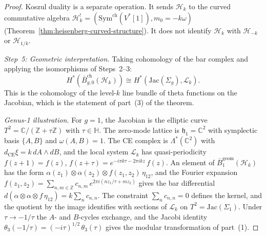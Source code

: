 \begin{proof}
Koszul duality is a separate operation. It sends
$\mathcal{H}_k$ to the curved commutative algebra
$\mathcal{H}_k^!=(\mathrm{Sym}^{\mathrm{ch}}(V^*[1]),m_0=-k\omega)$
(Theorem~\ref{thm:heisenberg-curved-structure}). It does not
identify $\mathcal{H}_k$ with $\mathcal{H}_{-k}$ or
$\mathcal{H}_{1/k}$.

\emph{Step~5: Geometric interpretation.}
Taking cohomology of the bar complex and applying the
isomorphisms of Steps~2--3:
\[
H^*(\bar{B}_{g,0}^{\mathrm{ch}}(\mathcal{H}_k))
\cong H^*(\mathrm{Jac}(\Sigma_g), \mathcal{L}_k).
\]
This is the cohomology of the level-$k$ line bundle
of theta functions on the Jacobian, which is the statement of
part~(3) of the theorem.

\medskip
\emph{Genus-1 illustration.}
For $g = 1$, the Jacobian is the elliptic curve
$T^2 = \mathbb{C}/(\mathbb{Z} + \tau\mathbb{Z})$ with
$\tau \in \mathbb{H}$.
The zero-mode lattice is $\mathfrak{h}_1 = \mathbb{C}^2$
with symplectic basis $\{A, B\}$ and $\omega(A,B) = 1$.
The CE complex is $\Lambda^*(\mathbb{C}^2)$ with
$d_{\mathrm{CE}}\xi = k\, dA \wedge dB$, and the local
system $\mathcal{L}_k$ has quasi-periodicity
$f(z+1) = f(z)$,
$f(z + \tau) = e^{-i\pi k\tau - 2\pi i k z}\, f(z)$.
An element of $\bar{B}_1^{\mathrm{geom}}(\mathcal{H}_k)$ has
the form
$\alpha(z_1) \otimes \alpha(z_2) \otimes f(z_1,z_2)\,\eta_{12}$,
and the Fourier expansion
$f(z_1,z_2) = \sum_{n,m \in \mathbb{Z}}
 c_{n,m}\, e^{2\pi i(nz_1/\tau + mz_2)}$
gives the bar differential
$d(\alpha \otimes \alpha \otimes f\,\eta_{12})
= k \sum_n c_{n,n}$.
The constraint $\sum_n c_{n,n} = 0$ defines the kernel, and the
quotient by the image identifies with sections of $\mathcal{L}_k$
on $T^2 = \mathrm{Jac}(\Sigma_1)$.
Under $\tau \to -1/\tau$ the $A$- and $B$-cycles exchange,
and the Jacobi identity
$\theta_3(-1/\tau) = (-i\tau)^{1/2}\,\theta_3(\tau)$
gives the modular transformation of part~(1).
\end{proof}

